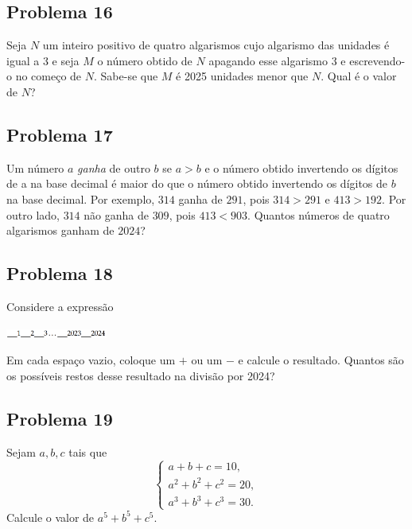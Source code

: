 \documentclass[12pt]{article}
\begin{document}
\clearpage

\subsection{Problema 16}
\begin{tcolorbox}[statementbox]
Seja \(N\) um inteiro positivo de quatro algarismos cujo algarismo das unidades é igual a 3 e seja \(M\) o número obtido de
\(N\) apagando esse algarismo 3 e escrevendo-o no começo de \(N\). Sabe-se que \(M\) é 2025 unidades menor que \(N\). Qual é o valor
de \(N\)?
\end{tcolorbox}

\clearpage

\subsection{Problema 17}
\begin{tcolorbox}[statementbox]
Um número $a$ \textit{ganha} de outro $b$ se $a > b$ e o número obtido invertendo os dígitos de a na base decimal é
maior do que o número obtido invertendo os dígitos de $b$ na base decimal. Por exemplo, $314$ ganha de $291$,
pois $314 > 291$ e $413 > 192$. Por outro lado, $314$ não ganha de $309$, pois $413 < 903$.
Quantos números de quatro algarismos ganham de $2024$?
\end{tcolorbox}

\clearpage

\subsection{Problema 18}
\begin{tcolorbox}[statementbox]
   Considere a expressão

          \begin{center}
            \includegraphics[width=0.25\textwidth]{seventh.png}
          \end{center}
          Em cada espaço vazio, coloque um \(+\) ou um \(-\) e calcule o resultado. Quantos são os possíveis restos desse resultado na
          divisão por 2024?
\end{tcolorbox}

\clearpage

\subsection{Problema 19}
\begin{tcolorbox}[statementbox]
Sejam \(a,b,c\) tais que
\[
  \begin{cases}
    a+b+c=10,\\
    a^2+b^2+c^2=20,\\
    a^3+b^3+c^3=30.
  \end{cases}
\]
Calcule o valor de \(a^5+b^5+c^5\).
\end{tcolorbox}
\end{document}
